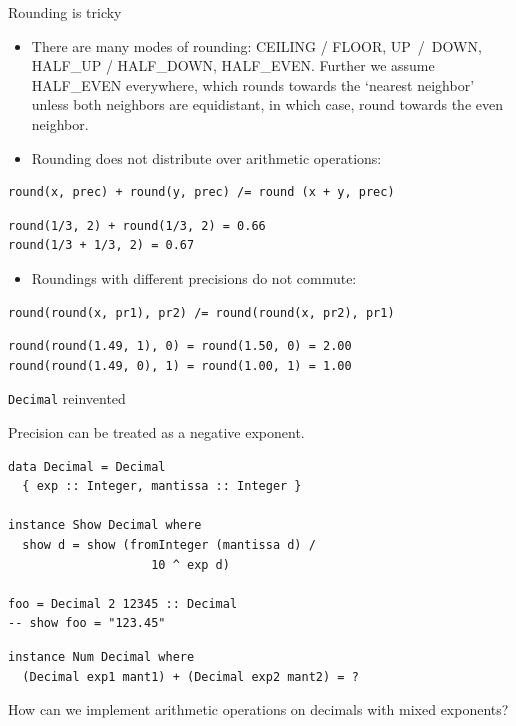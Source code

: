 \documentclass[handout]{beamer}
\begin{document}
\begin{frame}[fragile]{Rounding is tricky}

\begin{itemize}

\item There are many modes of rounding: CEILING / FLOOR, UP~/~DOWN, HALF\_UP / HALF\_DOWN, HALF\_EVEN.
  Further we assume HALF\_EVEN everywhere, which rounds towards the `nearest neighbor' unless both neighbors are equidistant,
  in which case, round towards the even neighbor.

\item Rounding does not distribute over arithmetic operations:

\end{itemize}

\begin{lstlisting}
round(x, prec) + round(y, prec) /= round (x + y, prec)
\end{lstlisting}

\begin{lstlisting}
round(1/3, 2) + round(1/3, 2) = 0.66
round(1/3 + 1/3, 2) = 0.67
\end{lstlisting}

\begin{itemize}
\item Roundings with different precisions do not commute:
\end{itemize}

\begin{lstlisting}
round(round(x, pr1), pr2) /= round(round(x, pr2), pr1)
\end{lstlisting}

\begin{lstlisting}
round(round(1.49, 1), 0) = round(1.50, 0) = 2.00
round(round(1.49, 0), 1) = round(1.00, 1) = 1.00
\end{lstlisting}

\end{frame}

\begin{frame}[fragile]{{\tt Decimal} reinvented}

Precision can be treated as a negative exponent.

\begin{lstlisting}
data Decimal = Decimal
  { exp :: Integer, mantissa :: Integer }

instance Show Decimal where
  show d = show (fromInteger (mantissa d) /
                    10 ^ exp d)

foo = Decimal 2 12345 :: Decimal
-- show foo = "123.45"
\end{lstlisting}

\begin{lstlisting}
instance Num Decimal where
  (Decimal exp1 mant1) + (Decimal exp2 mant2) = ?
\end{lstlisting}

How can we implement arithmetic operations on decimals with mixed exponents?

\end{frame}
\end{document}
